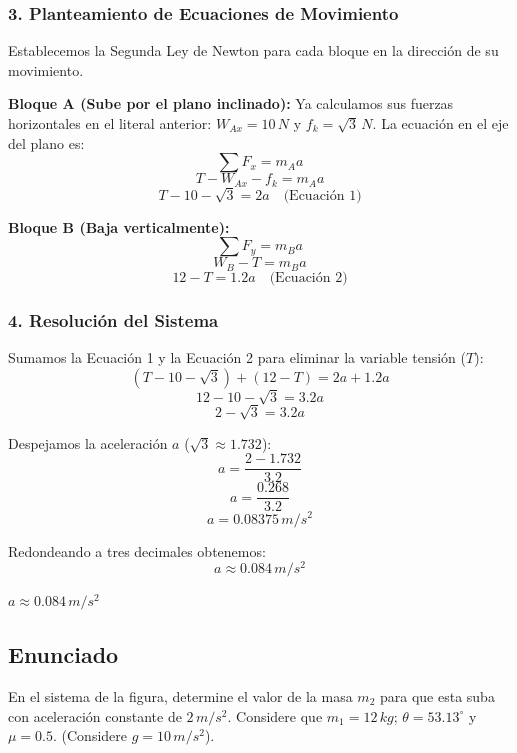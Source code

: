 \documentclass[12pt, a4paper]{article}
\begin{document}
\subsubsection*{3. Planteamiento de Ecuaciones de Movimiento}
Establecemos la Segunda Ley de Newton para cada bloque en la dirección de su movimiento.

\textbf{Bloque A (Sube por el plano inclinado):}
Ya calculamos sus fuerzas horizontales en el literal anterior:
$W_{Ax} = 10\,\si{N}$ y $f_k = \sqrt{3}\,\si{N}$.
La ecuación en el eje del plano es:
$$ \sum F_x = m_A a $$
$$ T - W_{Ax} - f_k = m_A a $$
$$ T - 10 - \sqrt{3} = 2a \quad \text{(Ecuación 1)} $$

\textbf{Bloque B (Baja verticalmente):}
$$ \sum F_y = m_B a $$
$$ W_B - T = m_B a $$
$$ 12 - T = 1.2a \quad \text{(Ecuación 2)} $$

\subsubsection*{4. Resolución del Sistema}
Sumamos la Ecuación 1 y la Ecuación 2 para eliminar la variable tensión ($T$):
$$ (T - 10 - \sqrt{3}) + (12 - T) = 2a + 1.2a $$
$$ 12 - 10 - \sqrt{3} = 3.2a $$
$$ 2 - \sqrt{3} = 3.2a $$

Despejamos la aceleración $a$ ($\sqrt{3} \approx 1.732$):
$$ a = \frac{2 - 1.732}{3.2} $$
$$ a = \frac{0.268}{3.2} $$
$$ a = 0.08375\,\si{m/s^2} $$

Redondeando a tres decimales obtenemos:
$$ a \approx 0.084\,\si{m/s^2} $$

\begin{tcolorbox}[colback=green!5!white, colframe=green!50!black, title=Respuesta Final]
\centering \Large $a \approx 0.084\,\si{m/s^2}$
\end{tcolorbox}

\newpage

\subsection*{Enunciado}
En el sistema de la figura, determine el valor de la masa $m_2$ para que esta suba con aceleración constante de $2\,\si{m/s^2}$. Considere que $m_1 = 12\,\si{kg}$; $\theta = 53.13^\circ$ y $\mu = 0.5$. (Considere $g = 10\,\si{m/s^2}$).
\end{document}
